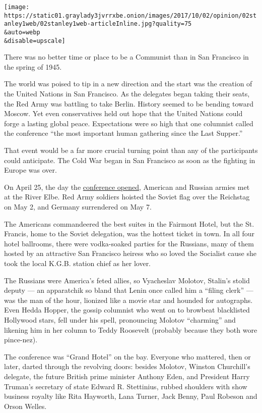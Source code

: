 \texttt{[image: https://static01.graylady3jvrrxbe.onion/images/2017/10/02/opinion/02stanley1web/02stanley1web-articleInline.jpg?quality=75\\\&auto=webp\\\&disable=upscale]}

There was no better time or place to be a Communist than in San
Francisco in the spring of 1945.

The world was poised to tip in a new direction and the start was the
creation of the United Nations in San Francisco. As the delegates began
taking their seats, the Red Army was battling to take Berlin. History
seemed to be bending toward Moscow. Yet even conservatives held out hope
that the United Nations could forge a lasting global peace. Expectations
were so high that one columnist called the conference ``the most
important human gathering since the Last Supper.''

That event would be a far more crucial turning point than any of the
participants could anticipate. The Cold War began in San Francisco as
soon as the fighting in Europe was over.

On April 25, the day the
\href{https://learning.blogs.nytimes3xbfgragh.onion/2012/04/25/april-25-1945-conference-to-form-un-meets-as-allied-forces-near-victory-over-nazis/?mcubz=0}{conference
opened}, American and Russian armies met at the River Elbe. Red Army
soldiers hoisted the Soviet flag over the Reichstag on May 2, and
Germany surrendered on May 7.

The Americans commandeered the best suites in the Fairmont Hotel, but
the St. Francis, home to the Soviet delegation, was the hottest ticket
in town. In all four hotel ballrooms, there were vodka-soaked parties
for the Russians, many of them hosted by an attractive San Francisco
heiress who so loved the Socialist cause she took the local K.G.B.
station chief as her lover.

The Russians were America's feted allies, so Vyacheslav Molotov,
Stalin's stolid deputy --- an apparatchik so bland that Lenin once
called him a ``filing clerk'' --- was the man of the hour, lionized like
a movie star and hounded for autographs. Even Hedda Hopper, the gossip
columnist who went on to browbeat blacklisted Hollywood stars, fell
under his spell, pronouncing Molotov ``charming'' and likening him in
her column to Teddy Roosevelt (probably because they both wore
pince-nez).

The conference was ``Grand Hotel'' on the bay. Everyone who mattered,
then or later, darted through the revolving doors: besides Molotov,
Winston Churchill's delegate, the future British prime minister Anthony
Eden, and President Harry Truman's secretary of state Edward R.
Stettinius, rubbed shoulders with show business royalty like Rita
Hayworth, Lana Turner, Jack Benny, Paul Robeson and Orson Welles.

